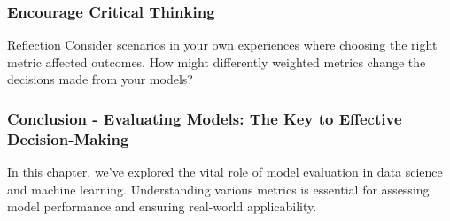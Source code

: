 \documentclass[aspectratio=169]{beamer}
\begin{document}
\begin{frame}[fragile]
    \frametitle{Encourage Critical Thinking}
    \begin{block}{Reflection}
        Consider scenarios in your own experiences where choosing the right metric affected outcomes.
        How might differently weighted metrics change the decisions made from your models?
    \end{block}
\end{frame}

\begin{frame}[fragile]
    \frametitle{Conclusion - Evaluating Models: The Key to Effective Decision-Making}
    In this chapter, we’ve explored the vital role of model evaluation in data science and machine learning. 
    Understanding various metrics is essential for assessing model performance and ensuring real-world applicability.
\end{frame}
\end{document}
